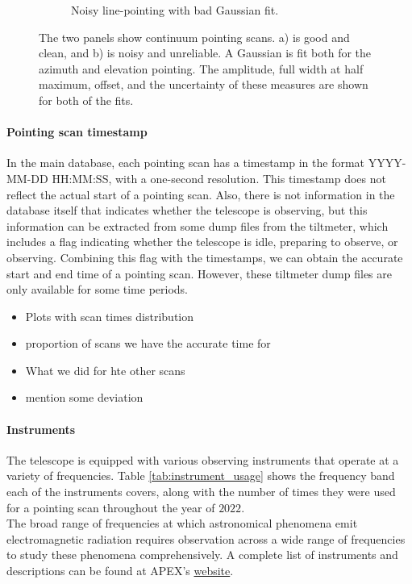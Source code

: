 \begin{figure}[H]
\begin{subfigure}[b]{0.75\textwidth}
         \caption{Noisy line-pointing with bad Gaussian fit.}
         \label{subfig:bad_continuous}
     \end{subfigure}
    \caption{The two panels show continuum pointing scans. a) is good and clean, and b) is noisy and unreliable. A Gaussian is fit both for the azimuth and elevation pointing. The amplitude, full width at half maximum, offset, and the uncertainty of these measures are shown for both of the fits.}
    \label{fig:continueous_pointings}
\end{figure}



\paragraph{Pointing scan timestamp} 
In the main database, each pointing scan has a timestamp in the format YYYY-MM-DD HH:MM:SS, with a one-second resolution. This timestamp does not reflect the actual start of a pointing scan. Also, there is not information in the database itself that indicates whether the telescope is observing, but this information can be extracted from some dump files from the tiltmeter, which includes a flag indicating whether the telescope is idle, preparing to observe, or observing. Combining this flag with the timestamps, we can obtain the accurate start and end time of a pointing scan. However, these tiltmeter dump files are only available for some time periods.

\begin{itemize}
    \item Plots with scan times distribution
    \item proportion of scans we have the accurate time for
    \item What we did for hte other scans
    \item mention some deviation
\end{itemize}

\paragraph{Instruments}
The telescope is equipped with various observing instruments that operate at a variety of frequencies.
Table \ref{tab:instrument_usage} shows the frequency band each of the instruments covers,
along with the number of times they were used for a pointing scan throughout the year of $2022$.\\

The broad range of frequencies at which astronomical phenomena emit electromagnetic radiation requires observation across a wide range of frequencies to study these phenomena comprehensively.
A complete list of instruments and descriptions can be found at APEX's \href{https://www.eso.org/sci/facilities/apex/cfp/cfp110/instrument_summary.html.html}{website}.


